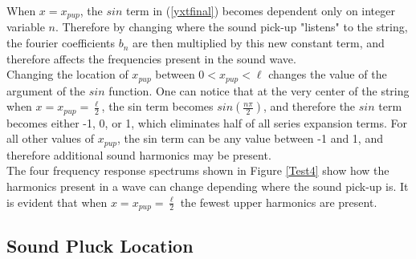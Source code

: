 \documentclass[%
 reprint,
 amsmath,amssymb,
 aps,
]{revtex4-1}
\begin{document}
When $x = x_{pup}$, the $sin$ term in (\ref{yxtfinal}) becomes dependent only on integer variable $n$. Therefore by changing where the sound pick-up "listens" to the string, the fourier coefficients $b_n$ are then multiplied by this new constant term, and therefore affects the frequencies present in the sound wave. \\

Changing the location of $x_{pup}$ between $ 0 < x_{pup} <\ell$ changes the value of the argument of the $sin$ function. One can notice that at the very center of the string when $x = x_{pup} = \frac{\ell}{2}$, the sin term becomes $sin(\frac{n \pi}{2})$, and therefore the $sin$ term becomes either -1, 0, or 1, which eliminates half of all series expansion terms. For all other values of $x_{pup}$, the sin term can be any value between -1 and 1, and therefore additional sound harmonics may be present.\\

The four frequency response spectrums shown in Figure \ref{Test4} show how the harmonics present in a wave can change depending where the sound pick-up is. It is evident that when $x = x_{pup} = \frac{\ell}{2}$ the fewest upper harmonics are present.
 


\subsection{\label{sec:level1}Sound Pluck Location}
\end{document}
